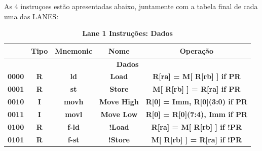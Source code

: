 \documentclass{article}
\begin{document}
    As 4 instruçoes estão apresentadas abaixo, juntamente com a tabela final de cada uma das LANES: 

    \begin{table}[H]
      \centering
      \captionsetup{labelformat=empty, skip=0pt}
      \caption{\textbf{Lane 1 Instruções: Dados}}
      \noindent\hspace*{-1.25cm}
      \begin{tabular}{|c|*{4}{c|}}
        \hline
        \rowcolor{gray!50}
        \multicolumn{1}{|c|}{\textbf{Opcode}} & \multicolumn{1}{|c|}{\textbf{Tipo}} & \multicolumn{1}{|c|}{\textbf{Mnemonic}} & \multicolumn{1}{|c|}{\textbf{Nome}}        & \multicolumn{1}{|c|}{\textbf{Operação}}                      \\ \hline
        \multicolumn{5}{|c|}{\textbf{Dados}} \\ \hline 
        \multicolumn{1}{|c|}{\textbf{0000}}   & \multicolumn{1}{c|}{\textbf{R}}     & \multicolumn{1}{c|}{\textbf{ld}}        & \multicolumn{1}{c|}{\textbf{Load}}         & \multicolumn{1}{c|}{\textbf{R[ra] = M[ R[rb] ] if PR}}       \\ \hline
        \multicolumn{1}{|c|}{\textbf{0001}}   & \multicolumn{1}{c|}{\textbf{R}}     & \multicolumn{1}{c|}{\textbf{st}}        & \multicolumn{1}{c|}{\textbf{Store}}        & \multicolumn{1}{c|}{\textbf{M[ R[rb] ] = R[ra] if PR}}       \\ \hline
        \multicolumn{1}{|c|}{\textbf{0010}}   & \multicolumn{1}{c|}{\textbf{I}}     & \multicolumn{1}{c|}{\textbf{movh}}      & \multicolumn{1}{c|}{\textbf{Move High}}    & \multicolumn{1}{c|}{\textbf{R[0] = {Imm, R[0](3:0)} if PR}}  \\ \hline
        \multicolumn{1}{|c|}{\textbf{0011}}   & \multicolumn{1}{c|}{\textbf{I}}     & \multicolumn{1}{c|}{\textbf{movl}}      & \multicolumn{1}{c|}{\textbf{Move Low}}     & \multicolumn{1}{c|}{\textbf{R[0] = {R[0](7:4), Imm} if PR}}  \\ \hline
        \multicolumn{1}{|c|}{\textbf{0100}}   & \multicolumn{1}{c|}{\textbf{R}}     & \multicolumn{1}{c|}{\textbf{f-ld}}      & \multicolumn{1}{c|}{\textbf{!Load}}        & \multicolumn{1}{c|}{\textbf{R[ra] = M[ R[rb] ] if !PR}}      \\ \hline
        \multicolumn{1}{|c|}{\textbf{0101}}   & \multicolumn{1}{c|}{\textbf{R}}     & \multicolumn{1}{c|}{\textbf{f-st}}      & \multicolumn{1}{c|}{\textbf{!Store}}       & \multicolumn{1}{c|}{\textbf{M[ R[rb] ] = R[ra] if !PR}}      \\ \hline

\end{tabular}
\end{table}
\end{document}

